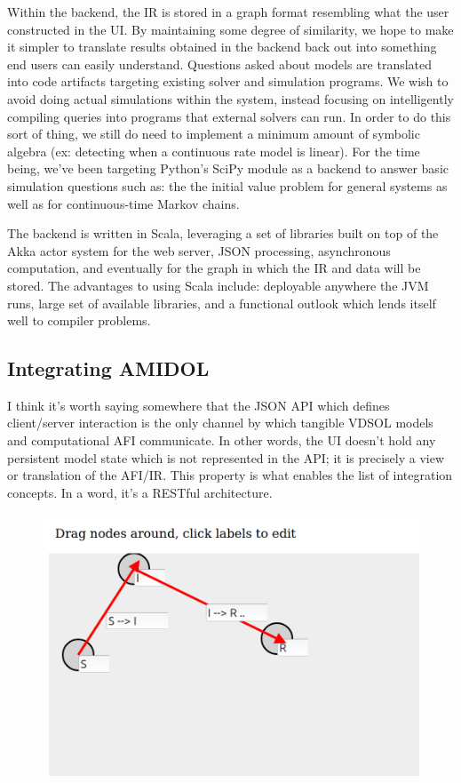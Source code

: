 \documentclass[11pt]{article}
\begin{document}
Within the backend, the IR is stored in a graph format resembling what the user constructed in the UI. By maintaining some degree of similarity, we hope to make it simpler to translate results obtained in the backend back out into something end users can easily understand. Questions asked about models are translated into code artifacts targeting existing solver and simulation programs. We wish to avoid doing actual simulations within the system, instead focusing on intelligently compiling queries into programs that external solvers can run. In order to do this sort of thing, we still do need to implement a minimum amount of symbolic algebra (ex: detecting when a continuous rate  model is linear). For the time being, we’ve been targeting Python’s SciPy module as a backend to answer basic simulation questions such as: the the initial value problem for general systems as well as for continuous-time Markov chains.

The backend is written in Scala, leveraging a set of libraries built on top of the Akka actor system for the web server, JSON processing, asynchronous computation, and eventually for the graph in which the IR and data will be stored. The advantages to using Scala include: deployable anywhere the JVM runs, large set of available libraries, and a functional outlook which lends itself well to compiler problems.

\subsection{Integrating AMIDOL}

I think it's worth saying somewhere that the JSON API which defines client/server interaction is the only channel by which tangible VDSOL models and computational AFI communicate. In other words, the UI doesn't hold any persistent model state which is not represented in the API; it is precisely a view or translation of the AFI/IR. This property is what enables the list of integration concepts. In a word, it's a RESTful architecture.

\begin{figure}
\includegraphics[width=\textwidth]{figs/Editor.png}
\caption{}
\label{Fig:Editor}
\end{figure}
\end{document}
